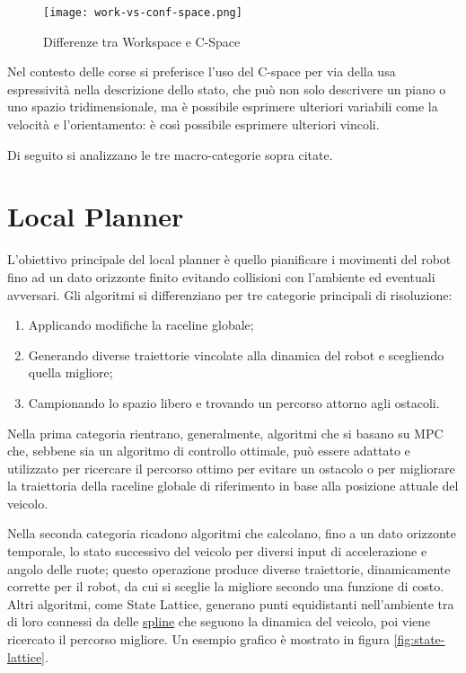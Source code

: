 \begin{figure}[H]
	\begin{center}
		\texttt{[image: work-vs-conf-space.png]}
	\end{center}
	\caption{Differenze tra Workspace e C-Space \cite{lection11}}
	\label{fig:work-vs-conf-space}
\end{figure}

Nel contesto delle corse si preferisce l'uso del C-space per via della usa espressività nella descrizione
dello stato, che può non solo descrivere un piano o uno spazio tridimensionale, ma è possibile esprimere
ulteriori variabili come la velocità e l'orientamento: è così possibile esprimere ulteriori vincoli.

\bigskip
\noindent Di seguito si analizzano le tre macro-categorie sopra citate.

\section{Local Planner}
L'obiettivo principale del local planner è quello pianificare i movimenti del robot fino ad un dato
orizzonte finito evitando collisioni con l'ambiente ed eventuali avversari. Gli algoritmi si
differenziano per tre categorie principali di risoluzione:
\begin{enumerate}
	\item Applicando modifiche la raceline globale; 
	\item Generando diverse traiettorie vincolate alla dinamica del robot e scegliendo quella migliore;
	\item Campionando lo spazio libero e trovando un percorso attorno agli ostacoli.
\end{enumerate}
Nella prima categoria rientrano, generalmente, algoritmi che si basano su MPC che, sebbene sia un
algoritmo di controllo ottimale, può essere adattato e utilizzato per ricercare il percorso ottimo per
evitare un ostacolo o per migliorare la traiettoria della raceline globale di riferimento in base alla
posizione attuale del veicolo.

Nella seconda categoria ricadono algoritmi che calcolano, fino a un dato orizzonte temporale, lo stato
successivo del veicolo per diversi input di accelerazione e angolo delle ruote; questo operazione produce
diverse traiettorie, dinamicamente corrette per il robot, da cui si sceglie la migliore secondo una
funzione di costo. Altri algoritmi, come State Lattice, generano punti equidistanti nell'ambiente tra di
loro connessi da delle \hyperref[par:spline-def]{spline} che seguono la dinamica del veicolo, poi viene
ricercato il percorso migliore. Un esempio grafico è mostrato in figura \ref{fig:state-lattice}.

